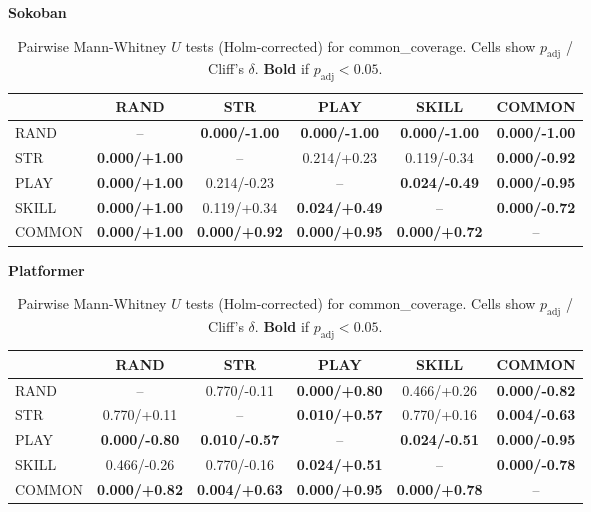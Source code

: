 \begin{table}[t]
\centering
\caption{Pairwise Mann-Whitney $U$ tests (Holm-corrected) for common_coverage. Cells show $p_{\text{adj}}$ / Cliff's $\delta$. \textbf{Bold} if $p_{\text{adj}} < 0.05$.}
\label{tab:pairwise-common_coverage}
\small
\setlength{\tabcolsep}{2.5pt}
\noindent\textbf{Sokoban}\\
\begin{tabular}{l c c c c c}
\toprule
 & RAND & STR & PLAY & SKILL & COMMON \\
\midrule
RAND & -- & \textbf{0.000/-1.00} & \textbf{0.000/-1.00} & \textbf{0.000/-1.00} & \textbf{0.000/-1.00} \\
STR & \textbf{0.000/+1.00} & -- & 0.214/+0.23 & 0.119/-0.34 & \textbf{0.000/-0.92} \\
PLAY & \textbf{0.000/+1.00} & 0.214/-0.23 & -- & \textbf{0.024/-0.49} & \textbf{0.000/-0.95} \\
SKILL & \textbf{0.000/+1.00} & 0.119/+0.34 & \textbf{0.024/+0.49} & -- & \textbf{0.000/-0.72} \\
COMMON & \textbf{0.000/+1.00} & \textbf{0.000/+0.92} & \textbf{0.000/+0.95} & \textbf{0.000/+0.72} & -- \\
\bottomrule
\end{tabular}
\vspace{4pt}
\noindent\textbf{Platformer}\\
\begin{tabular}{l c c c c c}
\toprule
 & RAND & STR & PLAY & SKILL & COMMON \\
\midrule
RAND & -- & 0.770/-0.11 & \textbf{0.000/+0.80} & 0.466/+0.26 & \textbf{0.000/-0.82} \\
STR & 0.770/+0.11 & -- & \textbf{0.010/+0.57} & 0.770/+0.16 & \textbf{0.004/-0.63} \\
PLAY & \textbf{0.000/-0.80} & \textbf{0.010/-0.57} & -- & \textbf{0.024/-0.51} & \textbf{0.000/-0.95} \\
SKILL & 0.466/-0.26 & 0.770/-0.16 & \textbf{0.024/+0.51} & -- & \textbf{0.000/-0.78} \\
COMMON & \textbf{0.000/+0.82} & \textbf{0.004/+0.63} & \textbf{0.000/+0.95} & \textbf{0.000/+0.78} & -- \\
\bottomrule
\end{tabular}
\vspace{4pt}
\end{table}
